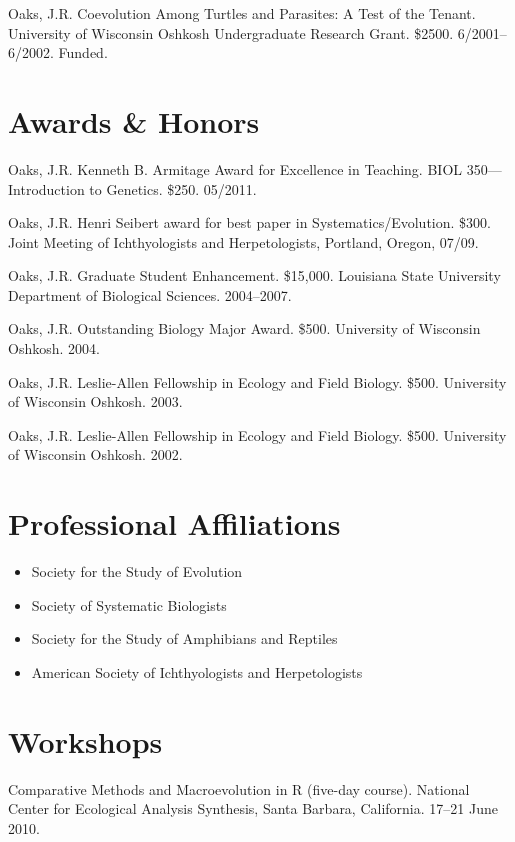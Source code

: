 \documentclass[10pt]{article}
\newenvironment{myItemize}{
  \begin{itemize}
    \setlength{\leftskip}{-4mm}
    \setlength{\itemsep}{0.25em}
    \setlength{\parskip}{0pt}
    \setlength{\parsep}{0.5em}}
  {\end{itemize}}
\begin{document}
\hangindent=5mm
Oaks, J.R.
Coevolution Among Turtles and Parasites: A Test of the Tenant.
University of Wisconsin Oshkosh Undergraduate Research Grant.
\$2500.
6/2001--6/2002.
Funded.

\section*{Awards \& Honors}
\hangindent=5mm
Oaks, J.R.
Kenneth B. Armitage Award for Excellence in Teaching.
BIOL 350---Introduction to Genetics.
\$250.
05/2011.

\hangindent=5mm
Oaks, J.R.
Henri Seibert award for best paper in Systematics/Evolution.
\$300.
Joint Meeting of Ichthyologists and Herpetologists, Portland, Oregon, 07/09.

\hangindent=5mm
Oaks, J.R.
Graduate Student Enhancement.
\$15,000.
Louisiana State University Department of Biological Sciences.
2004--2007.

\hangindent=5mm
Oaks, J.R.
Outstanding Biology Major Award.
\$500.
University of Wisconsin Oshkosh.
2004.

\hangindent=5mm
Oaks, J.R.
Leslie-Allen Fellowship in Ecology and Field Biology.
\$500.
University of Wisconsin Oshkosh.
2003.

\hangindent=5mm
Oaks, J.R.
Leslie-Allen Fellowship in Ecology and Field Biology.
\$500.
University of Wisconsin Oshkosh.
2002.

\section*{Professional Affiliations}
\begin{myItemize}
\item Society for the Study of Evolution
\item Society of Systematic Biologists
\item Society for the Study of Amphibians and Reptiles
\item American Society of Ichthyologists and Herpetologists
\end{myItemize}

\section*{Workshops}
\hangindent=5mm
Comparative Methods and Macroevolution in R (five-day course).
National Center for Ecological Analysis Synthesis, Santa Barbara, California.
17--21 June 2010.
\end{document}
